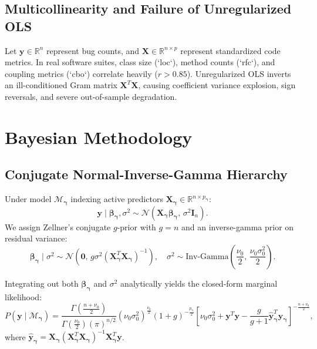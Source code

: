 \documentclass[11pt,a4paper]{article}
\begin{document}
\subsection{Multicollinearity and Failure of Unregularized OLS}
Let $\mathbf{y} \in \mathbb{R}^n$ represent bug counts, and $\mathbf{X} \in \mathbb{R}^{n \times p}$ represent standardized code metrics. In real software suites, class size (`loc`), method counts (`rfc`), and coupling metrics (`cbo`) correlate heavily ($r > 0.85$). Unregularized OLS inverts an ill-conditioned Gram matrix $\mathbf{X}^T\mathbf{X}$, causing coefficient variance explosion, sign reversals, and severe out-of-sample degradation.

\section{Bayesian Methodology}

\subsection{Conjugate Normal-Inverse-Gamma Hierarchy}
Under model $\mathcal{M}_{\boldsymbol{\gamma}}$ indexing active predictors $\mathbf{X}_{\boldsymbol{\gamma}} \in \mathbb{R}^{n \times p_{\boldsymbol{\gamma}}}$:
\begin{equation}
\mathbf{y} \mid \boldsymbol{\beta}_{\boldsymbol{\gamma}}, \sigma^2 \sim \mathcal{N}\left(\mathbf{X}_{\boldsymbol{\gamma}}\boldsymbol{\beta}_{\boldsymbol{\gamma}}, \, \sigma^2 \mathbf{I}_n\right).
\end{equation}
We assign Zellner's conjugate $g$-prior with $g = n$ and an inverse-gamma prior on residual variance:
\begin{equation}
\boldsymbol{\beta}_{\boldsymbol{\gamma}} \mid \sigma^2 \sim \mathcal{N}\left(\mathbf{0}, \, g \sigma^2 (\mathbf{X}_{\boldsymbol{\gamma}}^T\mathbf{X}_{\boldsymbol{\gamma}})^{-1}\right), \quad \sigma^2 \sim \text{Inv-Gamma}\left(\frac{\nu_0}{2}, \, \frac{\nu_0 \sigma_0^2}{2}\right).
\end{equation}

Integrating out both $\boldsymbol{\beta}_{\boldsymbol{\gamma}}$ and $\sigma^2$ analytically yields the closed-form marginal likelihood:
\begin{equation}
P(\mathbf{y} \mid \mathcal{M}_{\boldsymbol{\gamma}}) = \frac{\Gamma\left(\frac{n + \nu_0}{2}\right)}{\Gamma\left(\frac{\nu_0}{2}\right) (\pi)^{n/2}} (\nu_0 \sigma_0^2)^{\frac{\nu_0}{2}} (1 + g)^{-\frac{p_{\boldsymbol{\gamma}}}{2}} \left[ \nu_0 \sigma_0^2 + \mathbf{y}^T\mathbf{y} - \frac{g}{g+1} \hat{\mathbf{y}}_{\boldsymbol{\gamma}}^T \hat{\mathbf{y}}_{\boldsymbol{\gamma}} \right]^{-\frac{n + \nu_0}{2}},
\end{equation}
where $\hat{\mathbf{y}}_{\boldsymbol{\gamma}} = \mathbf{X}_{\boldsymbol{\gamma}} (\mathbf{X}_{\boldsymbol{\gamma}}^T\mathbf{X}_{\boldsymbol{\gamma}})^{-1}\mathbf{X}_{\boldsymbol{\gamma}}^T \mathbf{y}$.
\end{document}

